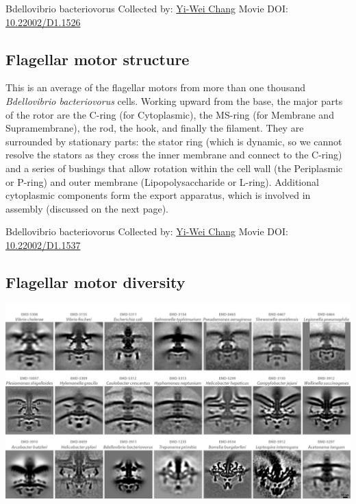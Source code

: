 \documentclass[]{tufte-book}
\begin{document}
\label{fig:6-2}Bdellovibrio bacteriovorus Collected by: \protect\hyperlink{yi-wei_chang}{Yi-Wei Chang} Movie DOI: \href{https://doi.org/10.22002/D1.1526}{10.22002/D1.1526}

\hypertarget{Flagellar_motor_structure}{%
\subsection{Flagellar motor structure}\label{Flagellar_motor_structure}}

This is an average of the flagellar motors from more than one thousand \emph{Bdellovibrio bacteriovorus} cells. Working upward from the base, the major parts of the rotor are the C-ring (for Cytoplasmic), the MS-ring (for Membrane and Supramembrane), the rod, the hook, and finally the filament. They are surrounded by stationary parts: the stator ring (which is dynamic, so we cannot resolve the stators as they cross the inner membrane and connect to the C-ring) and a series of bushings that allow rotation within the cell wall (the Periplasmic or P-ring) and outer membrane (Lipopolysaccharide or L-ring). Additional cytoplasmic components form the export apparatus, which is involved in assembly (discussed on the next page).



\hypertarget{htmlwidget-ee3d90087b1491da7cf4}{}

\label{fig:6-2a}Bdellovibrio bacteriovorus Collected by: \protect\hyperlink{yi-wei_chang}{Yi-Wei Chang} Movie DOI: \href{https://doi.org/10.22002/D1.1537}{10.22002/D1.1537}

\hypertarget{Flagellar_motor_diversity}{%
\subsection{Flagellar motor diversity}\label{Flagellar_motor_diversity}}

\includegraphics{img/schematics/6_2_1}
\end{document}

